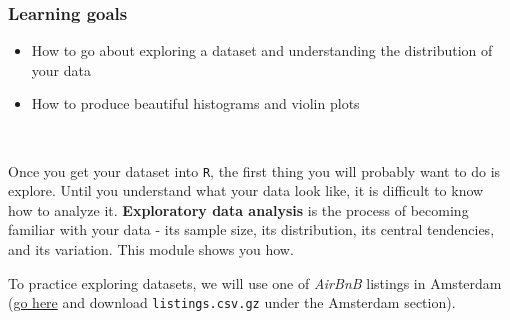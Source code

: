 \documentclass[
]{book}
\providecommand{\tightlist}{%
  \setlength{\itemsep}{0pt}\setlength{\parskip}{0pt}}
\begin{document}
\hypertarget{learning-goals-11}{%
\subsubsection*{Learning goals}\label{learning-goals-11}}

\begin{itemize}
\tightlist
\item
  How to go about exploring a dataset and understanding the distribution of your data\\
\item
  How to produce beautiful histograms and violin plots
\end{itemize}

~

Once you get your dataset into \texttt{R}, the first thing you will probably want to do is explore. Until you understand what your data look like, it is difficult to know how to analyze it. \textbf{Exploratory data analysis} is the process of becoming familiar with your data - its sample size, its distribution, its central tendencies, and its variation. This module shows you how.

To practice exploring datasets, we will use one of \emph{AirBnB} listings in Amsterdam (\href{http://insideairbnb.com/get-the-data.html}{go here} and download \texttt{listings.csv.gz} under the Amsterdam section).
\end{document}
